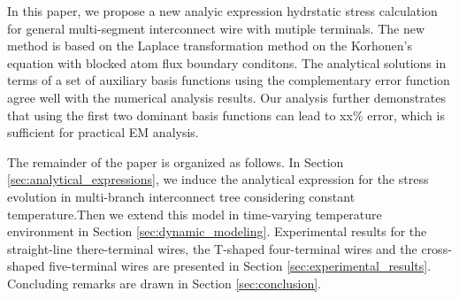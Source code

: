 In this paper, we propose a new analyic expression hydrstatic stress
calculation for general multi-segment interconnect wire with mutiple
terminals. The new method is based on the Laplace transformation
method on the Korhonen's equation with blocked atom flux boundary
conditons. The analytical solutions in terms of a set of auxiliary
basis functions using the complementary error function agree well with
the numerical analysis results. Our analysis further demonstrates that
using the first two dominant basis functions can lead to xx\% error,
which is sufficient for practical EM analysis.

The remainder of the paper is organized as follows. In Section
\ref{sec:analytical_expressions}, we induce the analytical expression
for the stress evolution in multi-branch interconnect tree considering
constant temperature.Then we extend this model in time-varying
temperature environment in Section
\ref{sec:dynamic_modeling}. Experimental results for the straight-line
there-terminal wires, the T-shaped four-terminal wires and the
cross-shaped five-terminal wires are presented in Section
\ref{sec:experimental_results}. Concluding remarks are drawn in
Section \ref{sec:conclusion}.



